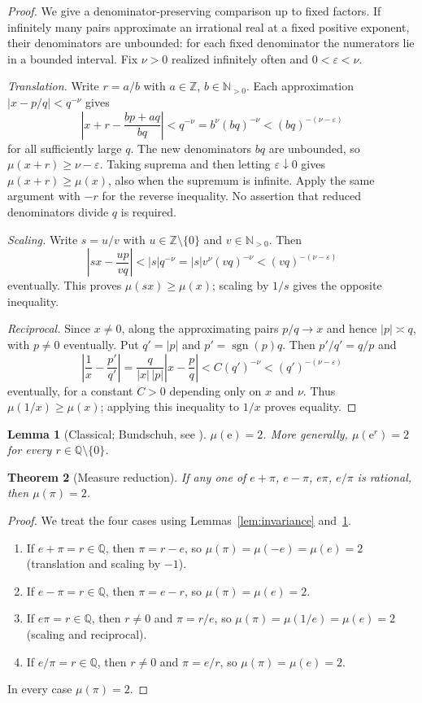 \documentclass[11pt]{amsart}
\newtheorem{theorem}{Theorem}[section]
\newtheorem{lemma}[theorem]{Lemma}
\theoremstyle{definition}
\theoremstyle{remark}
\numberwithin{equation}{section}
\newcommand{\Q}{\mathbb{Q}}
\newcommand{\Z}{\mathbb{Z}}
\newcommand{\N}{\mathbb{N}}
\newcommand{\irr}{\mu}
\newcommand{\ee}{\mathrm{e}}
\begin{document}
\begin{proof}
We give a denominator-preserving comparison up to fixed factors. If infinitely many pairs approximate an irrational real at a fixed positive exponent, their denominators are unbounded: for each fixed denominator the numerators lie in a bounded interval. Fix $\nu>0$ realized infinitely often and $0<\varepsilon<\nu$.

\emph{Translation.} Write $r=a/b$ with $a\in\Z$, $b\in\N_{>0}$. Each approximation $|x-p/q|<q^{-\nu}$ gives
\[
\left|x+r-\frac{bp+aq}{bq}\right|<q^{-\nu}
=b^\nu(bq)^{-\nu}<(bq)^{-(\nu-\varepsilon)}
\]
for all sufficiently large $q$. The new denominators $bq$ are unbounded, so $\irr(x+r)\ge\nu-\varepsilon$. Taking suprema and then letting $\varepsilon\downarrow0$ gives $\irr(x+r)\ge\irr(x)$, also when the supremum is infinite. Apply the same argument with $-r$ for the reverse inequality. No assertion that reduced denominators divide $q$ is required.

\emph{Scaling.} Write $s=u/v$ with $u\in\Z\setminus\{0\}$ and $v\in\N_{>0}$. Then
\[
\left|sx-\frac{up}{vq}\right|<|s|q^{-\nu}
=|s|v^\nu(vq)^{-\nu}<(vq)^{-(\nu-\varepsilon)}
\]
eventually. This proves $\irr(sx)\ge\irr(x)$; scaling by $1/s$ gives the opposite inequality.

\emph{Reciprocal.} Since $x\ne0$, along the approximating pairs $p/q\to x$ and hence $|p|\asymp q$, with $p\ne0$ eventually. Put $q'=|p|$ and $p'=\operatorname{sgn}(p)q$. Then $p'/q'=q/p$ and
\[
\left|\frac1x-\frac{p'}{q'}\right|
=\frac{q}{|x|\,|p|}\left|x-\frac pq\right|
<C(q')^{-\nu}<(q')^{-(\nu-\varepsilon)}
\]
eventually, for a constant $C>0$ depending only on $x$ and $\nu$. Thus $\irr(1/x)\ge\irr(x)$; applying this inequality to $1/x$ proves equality.
\end{proof}

\begin{lemma}[Classical; Bundschuh, see {\cite{CNU2024}}]\label{lem:mue}
$\irr(\ee)=2$. More generally, $\irr(\ee^r)=2$ for every $r\in\Q\setminus\{0\}$.
\end{lemma}

\begin{theorem}[Measure reduction]\label{thm:measure-reduction}
If any one of $e+\pi$, $e-\pi$, $e\pi$, $e/\pi$ is rational, then $\irr(\pi)=2$.
\end{theorem}

\begin{proof}
We treat the four cases using Lemmas~\ref{lem:invariance} and~\ref{lem:mue}.
\begin{enumerate}
\item If $e+\pi=r\in\Q$, then $\pi=r-e$, so $\irr(\pi)=\irr(-e)=\irr(e)=2$ (translation and scaling by $-1$).
\item If $e-\pi=r\in\Q$, then $\pi=e-r$, so $\irr(\pi)=\irr(e)=2$.
\item If $e\pi=r\in\Q$, then $r\ne0$ and $\pi=r/e$, so $\irr(\pi)=\irr(1/e)=\irr(e)=2$ (scaling and reciprocal).
\item If $e/\pi=r\in\Q$, then $r\ne0$ and $\pi=e/r$, so $\irr(\pi)=\irr(e)=2$.
\end{enumerate}
In every case $\irr(\pi)=2$.
\end{proof}
\end{document}
